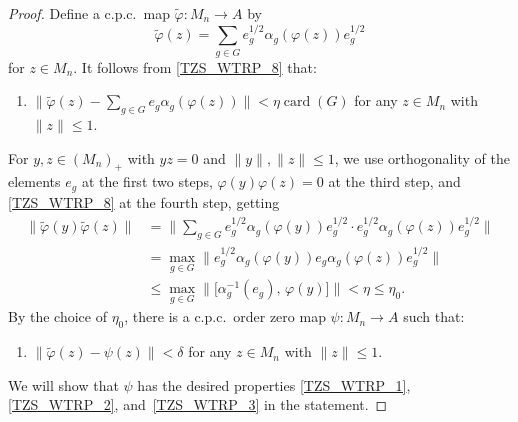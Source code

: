 \documentclass[11pt]{amsart}
\theoremstyle{plain}
\theoremstyle{definition}
\theoremstyle{remark}
\numberwithin{equation}{section}
\newcounter{TmpEnumi}
\newcommand{\card}{{\operatorname{card}}}
\begin{document}
\begin{proof}
Define a c.p.c.~map $\widetilde{\varphi} \colon M_{n} \to A$ by
\[
\widetilde{\varphi} (z)
 = \sum_{g \in G} e_{g}^{1/2} \alpha_{g} (\varphi (z)) e_{g}^{1/2}
\]
for $z \in M_n$.
It follows from \eqref{TZS_WTRP_8}
that:
%
\begin{enumerate}
\setcounter{enumi}{\value{TmpEnumi}}
\item\label{TZS_WTRP_New}
$\big\| \widetilde{\varphi} (z)
    - \sum_{g \in G} e_{g} \alpha_{g} (\varphi (z)) \big\|
 < \eta \card (G)$
for any $z \in M_{n}$ with $\| z \| \leq 1$.
\setcounter{TmpEnumi}{\value{enumi}}
\end{enumerate}
%
For $y, z \in (M_{n})_{+}$
with $y z = 0$ and $\|y\|, \|z\| \leq 1$,
we use orthogonality of the elements $e_g$
at the first two steps,
$\varphi (y) \varphi (z) = 0$ at the third step,
and \eqref{TZS_WTRP_8} at the fourth step,
getting
%
\begin{align*}
\| \widetilde{\varphi} (y) \widetilde{\varphi} (z) \|
& = \bigg\| \sum_{g \in G}
   e_{g}^{1/2} \alpha_{g} (\varphi (y)) e_{g}^{1/2}
    \cdot e_{g}^{1/2} \alpha_{g} (\varphi (z)) e_{g}^{1/2} \bigg\|
\\
& = \max_{g \in G} \big\| e_{g}^{1/2} \alpha_{g} (\varphi (y))
    e_{g} \alpha_{g} (\varphi (z)) e_{g}^{1/2} \big\|
\\
& \leq \max_{g \in G} \big\|
 \big[ \alpha_{g}^{-1} (e_{g}), \, \varphi (y) \big] \big\|
  < \eta
  \leq \eta_0.
\end{align*}
%
By the choice of $\eta_0$, there is a c.p.c.~order zero map
$\psi \colon M_{n} \to A$ such that:
%
\begin{enumerate}
\setcounter{enumi}{\value{TmpEnumi}}
\item\label{TZS_WTRP_X}
$\|\widetilde{ \varphi} (z) - \psi (z) \| < \delta$
for any $z \in M_{n}$ with $\| z \| \leq 1$.
\setcounter{TmpEnumi}{\value{enumi}}
\end{enumerate}
%
We will show that $\psi$ has the desired properties
\ref{TZS_WTRP_1}, \ref{TZS_WTRP_2}, and~\ref{TZS_WTRP_3}
in the statement.


\end{proof}
\end{document}
